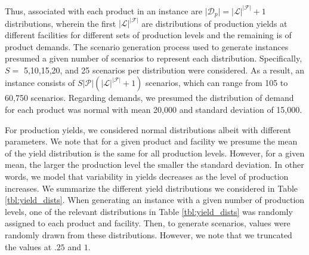 \documentclass[12pt]{article}
\theoremstyle{thmstylethree}%
\begin{document}
Thus, associated with each product in an instance are $\vert \mathcal{D}_{p} \vert =  \vert  \mathcal{L} \vert^{\vert \mathcal{F} \vert} + 1$ distributions, wherein the first $ \vert \mathcal{L} \vert^{\vert \mathcal{F} \vert} $ are distributions of production yields at different facilities for different sets of production levels and the remaining is of product demands. The scenario generation process used to generate instances presumed a given number of scenarios to represent each distribution. Specifically, $S =$ 5,10,15,20, and 25 scenarios per distribution were considered. As a result, an instance consists of $S\vert \mathcal{P} \vert (  \vert \mathcal{L} \vert^{\vert \mathcal{F} \vert} + 1)$ scenarios, which can range from 105 to 60,750 scenarios. Regarding demands, we presumed the distribution of demand for each product was normal with mean 20,000 and standard deviation of 15,000. 

For production yields, we considered normal distributions albeit with different parameters. We note that for a given product and facility we presume the mean of the yield distribution is the same for all production levels. However, for a given mean, the larger the production level the smaller the standard deviation. In other words, we model that variability in yields decreases as the level of production increases. We summarize the different yield distributions we considered in Table \ref{tbl:yield_dists}. When generating an instance with a given number of production levels, one of the relevant distributions in Table \ref{tbl:yield_dists} was randomly assigned to each product and facility. Then, to generate scenarios, values were randomly drawn from these distributions. However, we note that we truncated the values at $.25$ and $1.$
\end{document}
